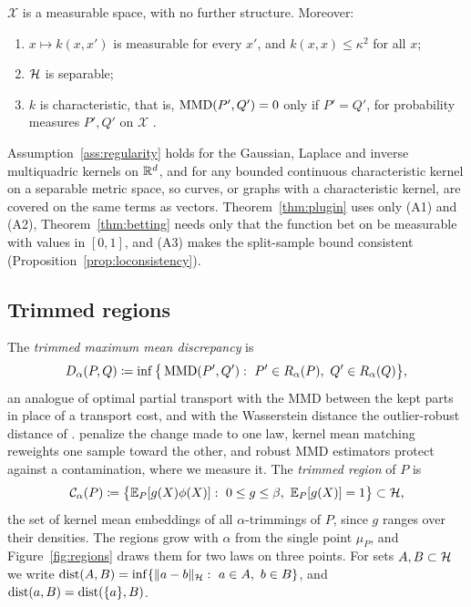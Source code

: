 \begin{assumption}
\label{ass:regularity}
$\mathcal X$ is a measurable space, with no further structure. Moreover:
\begin{enumerate}[label=(A\arabic*),leftmargin=*]
\item $x\mapsto k(x,x')$ is measurable for every $x'$, and $k(x,x)\le\kappa^2$ for all $x$;
\item $\mathcal{H}$ is separable;
\item $k$ is characteristic, that is, $\operatorname{MMD}(P',Q')=0$ only if $P'=Q'$, for probability measures $P',Q'$ on
$\mathcal X$ \citep{sriperumbudur2010hilbert}.
\end{enumerate}
\end{assumption}

Assumption~\ref{ass:regularity} holds for the Gaussian, Laplace and inverse multiquadric kernels on $\mathbb{R}^d$, and for
any bounded continuous characteristic kernel on a separable metric space, so curves, or graphs with a characteristic
kernel, are covered on the same terms as vectors. Theorem~\ref{thm:plugin} uses only (A1) and (A2),
Theorem~\ref{thm:betting} needs only that the function bet on be measurable with values in $[0,1]$, and (A3) makes the
split-sample bound consistent (Proposition~\ref{prop:loconsistency}).

\subsection{Trimmed regions}

The \emph{trimmed maximum mean discrepancy} is
\begin{equation}
D_\alpha(P,Q)\coloneqq\inf\big\{\MMD(P',Q'):\ P'\in R_\alpha(P),\ Q'\in R_\alpha(Q)\big\} ,
\label{eq:trimMMDpop}
\end{equation}
an analogue of optimal partial transport \citep{caffarelli2010free,figalli2010partial} with the MMD between the kept
parts in place of a transport cost, and with the Wasserstein distance the outlier-robust distance of
\citet{nietert2022robust}. \citet{mukherjee2021robust} penalize the change made to one law, kernel mean matching
\citep{huang2007correcting,gretton2008covariate} reweights one sample toward the other, and robust MMD estimators
\citep{lerasle2019monk,cherief2022finite} protect against a contamination, where we measure it. The \emph{trimmed
region} of $P$ is
\begin{equation}
\mathcal C_\alpha(P)\coloneqq\big\{\E_P[g(X)\phi(X)]:\ 0\le g\le\beta,\ \E_P[g(X)]=1\big\}\subset\Hh ,
\label{eq:region}
\end{equation}
the set of kernel mean embeddings of all $\alpha$-trimmings of $P$, since $g$ ranges over their densities. The regions
grow with $\alpha$ from the single point $\mu_P$, and Figure~\ref{fig:regions} draws them for two laws on three
points. For sets $A,B\subset\mathcal{H}$ we write $\operatorname{dist}(A,B)=\inf\{\|a-b\|_{\mathcal{H}}:\ a\in A,\ b\in B\}$, and
$\operatorname{dist}(a,B)=\operatorname{dist}(\{a\},B)$.

